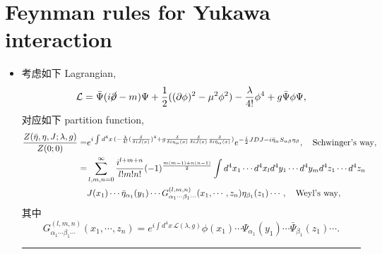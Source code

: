 \section{Feynman rules for Yukawa interaction}
\begin{itemize}
	\item 考虑如下 Lagrangian,
	\begin{equation}
		\mathcal{L} = \bar{\Psi} (i \cancel{\partial} - m) \Psi + \frac{1}{2} ((\partial \phi)^2 - \mu^2 \phi^2) - \frac{\lambda}{4!} \phi^4 + g \bar{\Psi} \phi \Psi,
	\end{equation}
	对应如下 partition function,
	\begin{align}
		\frac{Z(\bar{\eta}, \eta, J; \lambda, g)}{Z(0; 0)} =& e^{i \int d^4 x \, (- \frac{\lambda}{4!} (\frac{\delta}{\delta i J(x)})^4 + g \frac{\delta}{\delta i \eta_\alpha(x)} \frac{\delta}{\delta i J(x)} \frac{\delta}{\delta i \bar{\eta}_\alpha(x)})} e^{- \frac{i}{2} J D J - i \bar{\eta}_\alpha S_{\alpha \beta} \eta_\beta}, \quad \text{Schwinger's way}, \notag \\
		=& \sum_{l, m, n = 0}^\infty \frac{i^{l + m + n}}{l! m! n!} (- 1)^{\frac{m (m - 1) + n (n - 1)}{2}} \int d^4 x_1 \cdots d^4 x_l d^4 y_1 \cdots d^4 y_m d^4 z_1 \cdots d^4 z_n \notag \\
		& J(x_1) \cdots \bar{\eta}_{\alpha_1}(y_1) \cdots G^{(l, m, n)}_{\alpha_1 \cdots \beta_1 \cdots}(x_1, \cdots, z_n) \eta_{\beta_1}(z_1) \cdots, \quad \text{Weyl's way},
	\end{align}
	其中
	\begin{equation}
		G^{(l, m, n)}_{\alpha_1 \cdots \beta_1 \cdots}(x_1, \cdots, z_n) = e^{i \int d^4 x \, \mathcal{L}(\lambda, g)} \phi(x_1) \cdots \Psi_{\alpha_1}(y_1) \cdots \bar{\Psi}_{\beta_1}(z_1) \cdots.
	\end{equation}
	
	\noindent\rule[0.5ex]{\linewidth}{0.5pt} %
	

\end{itemize}
